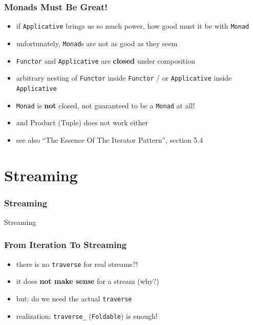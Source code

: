 \documentclass[aspectratio=169]{beamer}
\begin{document}
\begin{frame}
  \frametitle{Monads Must Be Great!}
  \begin{itemize}
  \item if \texttt{Applicative} brings us so much power, how good must it be with \texttt{Monad}
  \item unfortunately, \texttt{Monad}s are not as good as they seem
  \item \texttt{Functor} and \texttt{Applicative} are \textbf{closed} under composition
  \item arbitrary nesting of \texttt{Functor} inside \texttt{Functor}
    / or \texttt{Applicative} inside \texttt{Applicative}
  \item \texttt{Monad} is \textbf{not} closed, not guaranteed to be a \texttt{Monad} at all!
  \item and Product (Tuple) does not work either
  \item see also ``The Essence Of The Iterator Pattern'', section 5.4
  \end{itemize}
\end{frame}

\section{Streaming}\label{sec:streaming}

\begin{frame}
  \frametitle{Streaming}
  \begin{center}
    \huge
    Streaming
  \end{center}
\end{frame}

\begin{frame}
  \frametitle{From Iteration To Streaming}
  \begin{itemize}
  \item there is no \texttt{traverse} for real streams?!
  \item it does \textbf{not make sense} for a stream (why?)
  \item but: do we need the actual \texttt{traverse}
  \item realization: \texttt{traverse\_} (\texttt{Foldable}) is enough!
  \end{itemize}
  \vspace{5mm}
  \inputminted[fontsize=\small]{scala}{snippets/foldable-traverse.scala}
\end{frame}
\end{document}
